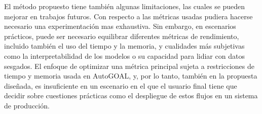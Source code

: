 El método propuesto tiene también algunas limitaciones, las cuales se pueden
mejorar en trabajos futuros. Con respecto a las métricas usadas pudiera
hacerse necesario una experimentación mas exhaustiva. Sin embargo, en
escenarios prácticos, puede ser necesario equilibrar diferentes métricas de
rendimiento, incluido también el uso del tiempo y la memoria, y cualidades más
subjetivas como la interpretabilidad de los modelos o su capacidad para lidiar
con datos sesgados. El enfoque de optimizar una métrica principal sujeta a
restricciones de tiempo y memoria usada en AutoGOAL, y, por lo tanto, también
en la propuesta diseñada, es insuficiente en un escenario en el que el usuario
final tiene que decidir sobre cuestiones prácticas como el despliegue de estos
flujos en un sistema de producción.
